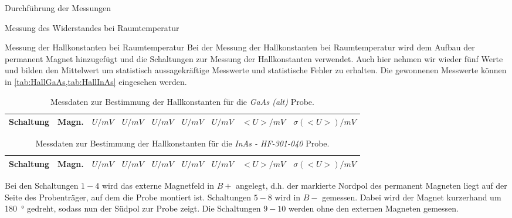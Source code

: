 \documentclass[pdftex, a4paper,11pt, twoside, ngerman]{report}
\begin{document}
\begin{chapter}{Durchführung der Messungen}
\begin{section}{Messung des Widerstandes bei Raumtemperatur}
      
      
    \end{section}
    
    
    
    \begin{section}{Messung der Hallkonstanten bei Raumtemperatur}
      \label{chp:MessungHallkonstanteRaumtemperatur}
      Bei der Messung der Hallkonstanten bei Raumtemperatur wird dem Aufbau der
      permanent Magnet hinzugefügt und die Schaltungen zur Messung der
      Hallkonstanten verwendet.
      Auch hier nehmen wir wieder fünf Werte und
      bilden den Mittelwert um statistisch aussagekräftige Messwerte und
      statistische Fehler zu erhalten.
      Die gewonnenen Messwerte können in
      \cref{tab:HallGaAs,tab:HallInAs} eingesehen werden.
      \begin{table}[htbp]
        \centering
        \footnotesize
        \begin{tabular}{|c|c|c|c|c|c|c|c|c|}
          \hline
          Schaltung & Magn. & $U / mV$ & $U / mV$  & $U / mV$  & $U / mV$  & $U / mV$
               & $<U> / mV$  & $\sigma(<U>) / mV$ \\ \hline
          
        \end{tabular}
        \caption{Messdaten zur Bestimmung der Hallkonstanten für die
            \textit{GaAs (alt)} Probe.}
        \label{tab:HallGaAs}
      \end{table}
      \begin{table}[htbp]
        \centering
        \footnotesize
        \begin{tabular}{|c|c|c|c|c|c|c|c|c|}
          \hline
          Schaltung & Magn. & $U / mV$ & $U / mV$  & $U / mV$  & $U / mV$  & $U / mV$
               & $<U> / mV$  & $\sigma(<U>) / mV$ \\ \hline
          
        \end{tabular}
        \caption{Messdaten zur Bestimmung der Hallkonstanten für die
            \textit{InAs - HF-301-040} Probe.}
        \label{tab:HallInAs}
      \end{table}
      
      Bei den Schaltungen $1-4$ wird das externe Magnetfeld in \textit{$B+$}
      angelegt, d.h. der markierte Nordpol des permanent Magneten liegt auf
      der Seite des Probenträger, auf dem die Probe montiert ist.
      Schaltungen $5-8$ wird in \textit{$B-$} gemessen. Dabei wird der Magnet
      kurzerhand um \SI{180}{\degree} gedreht, sodass nun der Südpol zur Probe
      zeigt.
      Die Schaltungen $9-10$ werden ohne den externen Magneten gemessen.
      

\end{section}
\end{chapter}
\end{document}
